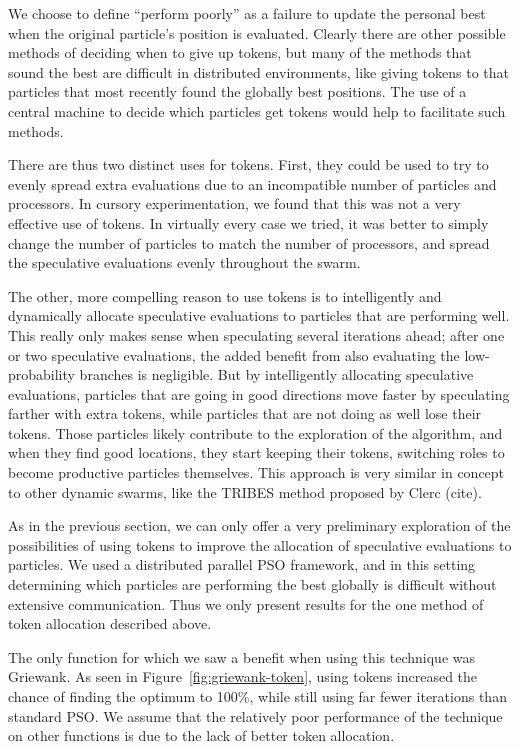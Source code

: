 \documentclass[journal,letterpaper]{IEEEtran}
\newcommand{\fig}[1]{Figure~\ref{fig:#1}}
\begin{document}
We choose to define ``perform poorly'' as a failure to update the personal best
when the original particle's position is evaluated.  Clearly there are other
possible methods of deciding when to give up tokens, but many of the methods
that sound the best are difficult in distributed environments, like giving
tokens to that particles that most recently found the globally best positions.
The use of a central machine to decide which particles get tokens would help to
facilitate such methods.

There are thus two distinct uses for tokens.  First, they could be used to try
to evenly spread extra evaluations due to an incompatible number of particles
and processors.  In cursory experimentation, we found that this was not a very
effective use of tokens.  In virtually every case we tried, it was better to
simply change the number of particles to match the number of processors, and 
spread the speculative evaluations evenly throughout the swarm.

The other, more compelling reason to use tokens is to intelligently and
dynamically allocate speculative evaluations to particles that are performing
well.  This really only makes sense when speculating several iterations ahead;
after one or two speculative evaluations, the added benefit from also
evaluating the low-probability branches is negligible.  But by intelligently
allocating speculative evaluations, particles that are going in good directions
move faster by speculating farther with extra tokens, while particles that are
not doing as well lose their tokens.  Those particles likely contribute to the
exploration of the algorithm, and when they find good locations, they start
keeping their tokens, switching roles to become productive particles
themselves.  This approach is very similar in concept to other dynamic swarms,
like the TRIBES method proposed by Clerc (cite).

As in the previous section, we can only offer a very preliminary exploration of
the possibilities of using tokens to improve the allocation of speculative
evaluations to particles.  We used a distributed parallel PSO framework, and in
this setting determining which particles are performing the best globally is
difficult without extensive communication.  Thus we only present results for
the one method of token allocation described above.  

The only function for which we saw a benefit when using this technique was
Griewank.  As seen in \fig{griewank-token}, using tokens increased the chance
of finding the optimum to 100\%, while still using far fewer iterations than
standard PSO.  We assume that the relatively poor performance of the technique
on other functions is due to the lack of better token allocation.
\end{document}
